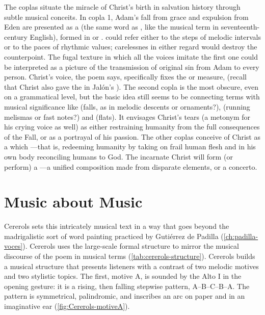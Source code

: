 The coplas situate the miracle of Christ's birth in salvation history through
subtle musical conceits.
In copla 1, Adam's fall from grace and expulsion from Eden are presented as a
 (the same word as , like the musical term
 in seventeenth-century English), formed in 
or . 
 could refer either to the steps of melodic intervals or to the
paces of rhythmic values; carelessnes in either regard would destroy the
counterpoint.
The fugal texture in which all the voices imitate the first one could be
interpreted as a picture of the transmission of original sin from Adam to every
person.
Christ's voice, the poem says, specifically fixes the  or measure,
 (recall that Christ also gave the
 in Jalón's ).
The second copla is the most obscure, even on a grammatical level, but the basic
idea still seems to be connecting terms with musical significance like
 (falls, as in melodic descents or ornaments?), 
(running melismas or fast notes?) and  (flats).
It envisages Christ's tears (a metonym for his crying voice as well) as either
restraining humanity from the full consequences of the Fall, or as a portrayal
of his passion.
The other coplas conceive of Christ as a  which
---that is, redeeming
humanity by taking on frail human flesh and in his own body reconciling humans
to God.%
The incarnate Christ will form (or perform) a ---a unified
composition made from disparate elements, or a concerto.

\section{Music about Music}

Cererols sets this intricately musical text in a way that goes beyond the
madrigalistic sort of word painting practiced by Gutiérrez de Padilla
(\cref{ch:padilla-voces}).
Cererols uses the large-scale formal structure to mirror the musical discourse
of the poem in musical terms (\cref{tab:cererols-structure}).
Cererols builds a musical structure that presents listeners with a contrast of
two melodic motives and two stylistic topics.
The first, motive A, is sounded by the Alto I in the opening gesture: it is a
rising, then falling stepwise pattern, A--B--C--B--A.
The pattern is symmetrical, palindromic, and inscribes an arc on paper and in an
imaginative ear (\cref{fig:Cererols-motiveA}).

